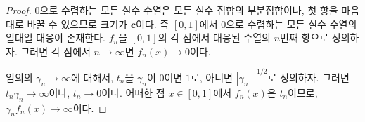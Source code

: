 \begin{proof}
	$0$으로 수렴하는 모든 실수 수열은 모든 실수 집합의 부분집합이나, 첫 항을 마음대로 바꿀 수 있으므로 크기가 $\mathbf{c}$이다.
	즉 $[0, 1]$에서 $0$으로 수렴하는 모든 실수 수열의 일대일 대응이 존재한다.
	$f_n$을 $[0, 1]$의 각 점에서 대응된 수열의 $n$번째 항으로 정의하자.
	그러면 각 점에서 $n \to \infty$면 $f_n(x) \to 0$이다.

	임의의 $\gamma_n \to \infty$에 대해서, $t_n$을 $\gamma_n$이 $0$이면 $1$로, 아니면 $|\gamma_n|^{-1/2}$로 정의하자.
	그러면 $t_n\gamma_n \to \infty$이나, $t_n \to 0$이다.
	어떠한 점 $x \in [0, 1]$에서 $f_n(x)$은 $t_n$이므로, $\gamma_n f_n(x) \to \infty$이다.
\end{proof}